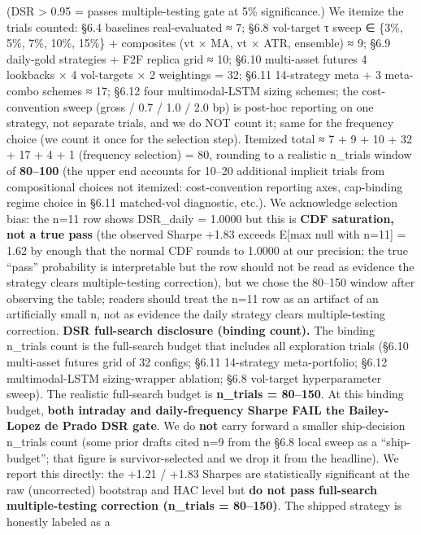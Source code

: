 \documentclass[
]{article}
\begin{document}
(DSR \textgreater{} 0.95 = passes multiple-testing gate at 5\%
significance.) We itemize the trials counted: §6.4 baselines
real-evaluated ≈ 7; §6.8 vol-target τ sweep ∈ \{3\%, 5\%, 7\%, 10\%,
15\%\} + composites (vt × MA, vt × ATR, ensemble) ≈ 9; §6.9 daily-gold
strategies + F2F replica grid ≈ 10; §6.10 multi-asset futures 4
lookbacks × 4 vol-targets × 2 weightings = 32; §6.11 14-strategy meta +
3 meta-combo schemes ≈ 17; §6.12 four multimodal-LSTM sizing schemes;
the cost-convention sweep (gross / 0.7 / 1.0 / 2.0 bp) is post-hoc
reporting on one strategy, not separate trials, and we do NOT count it;
same for the frequency choice (we count it once for the selection step).
Itemized total ≈ 7 + 9 + 10 + 32 + 17 + 4 + 1 (frequency selection) =
80, rounding to a realistic n\_trials window of \textbf{80--100} (the
upper end accounts for 10--20 additional implicit trials from
compositional choices not itemized: cost-convention reporting axes,
cap-binding regime choice in §6.11 matched-vol diagnostic, etc.). We
acknowledge selection bias: the n=11 row shows DSR\_daily = 1.0000 but
this is \textbf{CDF saturation, not a true pass} (the observed Sharpe
+1.83 exceeds E{[}max \textbar{} null with n=11{]} = 1.62 by enough that
the normal CDF rounds to 1.0000 at our precision; the true ``pass''
probability is interpretable but the row should not be read as evidence
the strategy clears multiple-testing correction), but we chose the
80--150 window after observing the table; readers should treat the n=11
row as an artifact of an artificially small n, not as evidence the daily
strategy clears multiple-testing correction. \textbf{DSR full-search
disclosure (binding count).} The binding n\_trials count is the
full-search budget that includes all exploration trials (§6.10
multi-asset futures grid of 32 configs; §6.11 14-strategy
meta-portfolio; §6.12 multimodal-LSTM sizing-wrapper ablation; §6.8
vol-target hyperparameter sweep). The realistic full-search budget is
\textbf{n\_trials = 80--150}. At this binding budget, \textbf{both
intraday and daily-frequency Sharpe FAIL the Bailey-Lopez de Prado DSR
gate}. We do \textbf{not} carry forward a smaller ship-decision
n\_trials count (some prior drafts cited n=9 from the §6.8 local sweep
as a ``ship-budget''; that figure is survivor-selected and we drop it
from the headline). We report this directly: the +1.21 / +1.83 Sharpes
are statistically significant at the raw (uncorrected) bootstrap and HAC
level but \textbf{do not pass full-search multiple-testing correction
(n\_trials = 80--150)}. The shipped strategy is honestly labeled as a
\end{document}
